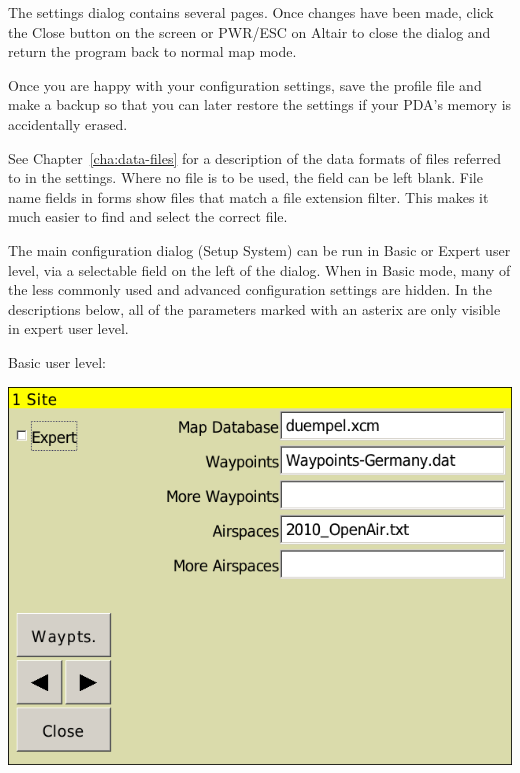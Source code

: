 \documentclass[a4paper,12pt]{refrep}
\begin{document}
The settings dialog contains several pages.  Once changes have been made,
click the Close button on the screen or PWR/ESC on Altair to close the dialog
and return the program back to normal map mode.

\tip Once you are happy with your configuration settings, save the
profile file and make a backup so that you can later restore the
settings if your PDA's memory is accidentally erased.

See Chapter~\ref{cha:data-files} for a description of the data formats
of files referred to in the settings.  Where no file is to be used,
the field can be left blank.  File name fields in forms show files
that match a file extension filter.  This makes it much easier to find
and select the correct file.

The main configuration dialog (Setup System) can be run in Basic or
Expert user level, via a selectable field on the left of the dialog.
When in Basic mode, many of the less commonly used and advanced
configuration settings are hidden.  In the descriptions below,
all of the parameters marked with an asterix are only visible in
expert user level.

Basic user level:
\begin{center}
\includegraphics[angle=0,width=\linewidth,keepaspectratio='true']{figures/config-basic.png}
\end{center}
\end{document}
